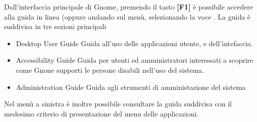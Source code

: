 Dall'interfaccia principale di Gnome, premendo il tasto \textbf{[F1]} è possibile accedere alla guida in linea (oppure andando sul menù, selezionando la voce . La guida è suddivisa in tre sezioni principali

\begin{itemize}
 \item Desktop User Guide
 \subitem Guida all'uso delle applicazioni utente, e dell'intefaccia.
 \item Accessibility Guide
 \subitem Guida per utenti ed amministratori interessati a scoprire come Gnone supporti le persone disabili nell'uso del sistema. 
 \item Administration Guide
 \subitem Guida agli strumenti di amministazione del sistema
\end{itemize}

Nel menù a sinistra è inoltre possibile consultare la guida suddivisa con il medesimo criterio di presentazione del menu delle applicazioni. 


